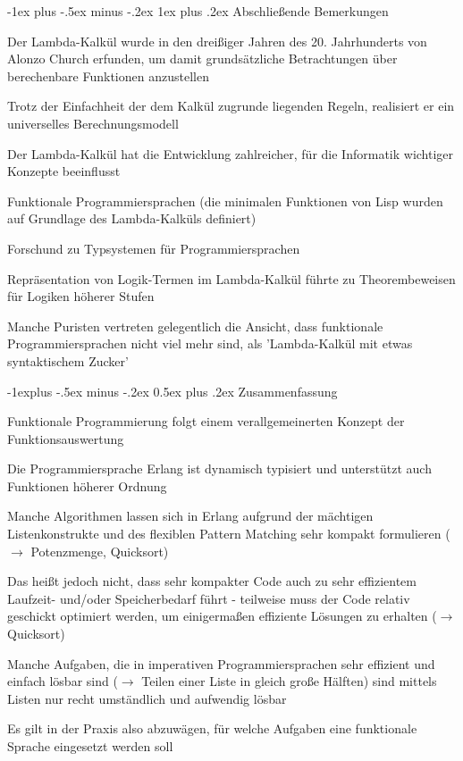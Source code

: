 \documentclass[10pt]{article}
\makeatletter
\renewcommand{\subsection}{\@startsection{subsection}{2}{0mm}%
                                {-1explus -.5ex minus -.2ex}%
                                {0.5ex plus .2ex}%
                                {\normalfont\normalsize\bfseries}}
\renewcommand{\subsubsection}{\@startsection{subsubsection}{3}{0mm}%
                                {-1ex plus -.5ex minus -.2ex}%
                                {1ex plus .2ex}%
                                {\normalfont\small\bfseries}}
\makeatother
\begin{document}
\subsubsection{Abschließende Bemerkungen}
\begin{itemize*}
  \item Der Lambda-Kalkül wurde in den dreißiger Jahren des 20. Jahrhunderts von Alonzo Church erfunden, um damit grundsätzliche Betrachtungen über berechenbare Funktionen anzustellen
  \item Trotz der Einfachheit der dem Kalkül zugrunde liegenden Regeln, realisiert er ein universelles Berechnungsmodell
  \item Der Lambda-Kalkül hat die Entwicklung zahlreicher, für die Informatik wichtiger Konzepte beeinflusst
  \begin{itemize*}
    \item Funktionale Programmiersprachen (die minimalen Funktionen von Lisp wurden auf Grundlage des Lambda-Kalküls definiert)
    \item Forschund zu Typsystemen für Programmiersprachen
    \item Repräsentation von Logik-Termen im Lambda-Kalkül führte zu Theorembeweisen für Logiken höherer Stufen
  \end{itemize*}
  \item Manche Puristen vertreten gelegentlich die Ansicht, dass funktionale Programmiersprachen nicht viel mehr sind, als 'Lambda-Kalkül mit etwas syntaktischem Zucker'
\end{itemize*}

\subsection{Zusammenfassung}
\begin{itemize*}
  \item Funktionale Programmierung folgt einem verallgemeinerten Konzept der Funktionsauswertung
  \item Die Programmiersprache Erlang ist dynamisch typisiert und unterstützt auch Funktionen höherer Ordnung
  \item Manche Algorithmen lassen sich in Erlang aufgrund der mächtigen Listenkonstrukte und des flexiblen Pattern Matching sehr kompakt formulieren ($\rightarrow$ Potenzmenge, Quicksort)
  \item Das heißt jedoch nicht, dass sehr kompakter Code auch zu sehr effizientem Laufzeit- und/oder Speicherbedarf führt - teilweise muss der Code relativ geschickt optimiert werden, um einigermaßen effiziente Lösungen zu erhalten ($\rightarrow$ Quicksort)
  \item Manche Aufgaben, die in imperativen Programmiersprachen sehr effizient und einfach lösbar sind ($\rightarrow$ Teilen einer Liste in gleich große Hälften) sind mittels Listen nur recht umständlich und aufwendig lösbar
  \item Es gilt in der Praxis also abzuwägen, für welche Aufgaben eine funktionale Sprache eingesetzt werden soll
\end{itemize*}
\end{document}
